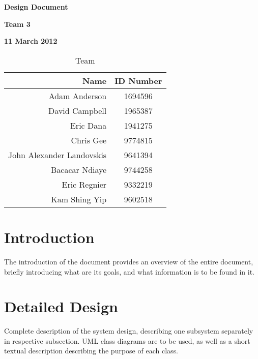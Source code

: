 \documentclass[12pt]{article}
\begin{document}
\vspace*{0.5in}
\centerline{\bf\Large Design Document}

\vspace*{0.5in}
\centerline{\bf\Large Team 3}

\vspace*{0.5in}
\centerline{\bf\Large 11 March 2012}

\vspace*{1.5in}
\begin{table}[htbp]
\caption{Team}
\begin{center}
\begin{tabular}{|r | c|}
\hline
Name & ID Number \\
\hline\hline
Adam Anderson & 1694596\\
David Campbell & 1965387\\
Eric Dana & 1941275\\
Chris Gee & 9774815\\
John Alexander Landovskis & 9641394\\
Bacacar Ndiaye & 9744258\\
Eric Regnier & 9332219\\
Kam Shing Yip & 9602518\\
\hline
\end{tabular}
\end{center}
\end{table}

\clearpage

\section{Introduction}

The introduction of the document provides an overview of the entire document,
briefly introducing what are its goals, and what information is to be found in it.



\section{Detailed Design} \label{sec:detail}

Complete description of the system design, describing one subsystem separately in respective subsection.
UML class diagrams are to be used, as well as a short textual description describing the purpose of each class.







\end{document}
